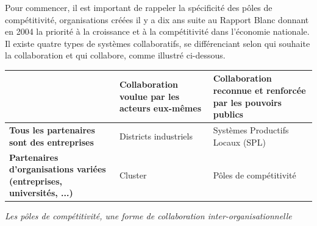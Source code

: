 \documentclass[a4paper,12pt]{report}
\begin{document}
		Pour commencer, il est important de rappeler la spécificité des pôles de compétitivité, organisations créées il y a dix ans suite au Rapport Blanc donnant en 2004 la priorité à la croissance et à la compétitivité dans l’économie nationale\cite{RapportBlanc}. Il existe quatre types de systèmes collaboratifs, se différenciant selon qui souhaite la collaboration et qui collabore, comme illustré ci-dessous\cite{PoleCompetitivite}.
		\vspace{11pt}
		\begin{center}
		\begin{tabular}{|M{110pt}|M{100pt}|M{100pt}|}
			\hline
			& \textbf{Collaboration voulue par les acteurs eux-mêmes} & \textbf{Collaboration reconnue et renforcée par les pouvoirs publics}\\
			\hline
			\textbf{Tous les partenaires sont des entreprises} & Districts industriels & Systèmes Productifs Locaux (SPL)\\
			\hline
			\textbf{Partenaires d'organisations variées (entreprises, universités, ...)} & Cluster & Pôles de compétitivité\\
			\hline
		\end{tabular}
		
		\emph{Les pôles de compétitivité, une forme de collaboration inter-organisationnelle\\}
		\end{center}
		
\end{document}
